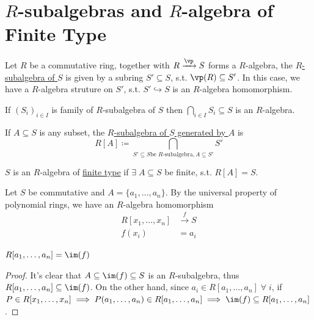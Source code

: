\section{\( R \)-subalgebras and \( R \)-algebra of Finite Type}

\begin{definition}
	Let \( R \) be a commutative ring, together with \( R \xrightarrow{\vp} S \) forms a \( R \)-algebra, the \underline{\( R \)-subalgebra of \( S \)} is given by a subring \( S' \subseteq S \), s.t. \( \vp(R) \subseteq S' \). In this case, we have a \( R \)-algebra struture on \( S' \), s.t. \( S'\hookrightarrow S \) is an \( R \)-algebra homomorphism. 
\end{definition}

\begin{proposition}
	If \( (S_i)_{i\in I} \) is family of \( R \)-subalgebra of \( S \) then \( \bigcap_{i\in I} S_i \subseteq S \) is an \( R \)-algebra.
\end{proposition}

\begin{definition}
	If \( A \subseteq S \) is any subset, the \underline{\( R \)-subalgebra of \( S \) generated by \( A \)} is
	\[
		R[A] \coloneqq  \bigcap_{S' \subseteq S \text{be } R \text{-subalgebra}, A \subseteq S'} S'
	\]
\end{definition}

\begin{definition}
	\( S \) is an \( R \)-algebra of \underline{finite type} if \( \exists \; A \subseteq S \) be finite, s.t. \( R[A]  = S\).
\end{definition}

\begin{eg}
	Let \( S \) be commutative and \( A = \{a_1, \ldots, a_n\}\). By the universal property of polynomial rings, we have an \( R \)-algebra homomorphism
	\[
		\begin{aligned}
			R[x_1, \ldots, x_n] & \xrightarrow{f} S \\
			f(x_i)              & = a_i
		\end{aligned}
	\]
	\begin{claim}
		\( R[a_1,\ldots, a_n] = \im(f) \)
	\end{claim}
	\begin{proof}
		It's clear that \( A \subseteq \im(f) \subseteq S \) is an \( R \)-subalgebra, thus \( R[a_1,\ldots, a_n] \subseteq \im(f)\). On the other hand, since \( a_i \in R[a_1,\ldots, a_n] \; \forall \; i \), if \( P \in R[x_1,\ldots, x_n] \implies P(a_1,\ldots, a_n) \in R[a_1,\ldots, a_n] \implies \im(f)\subseteq R[a_1,\ldots, a_n]\).
	\end{proof}
\end{eg}

